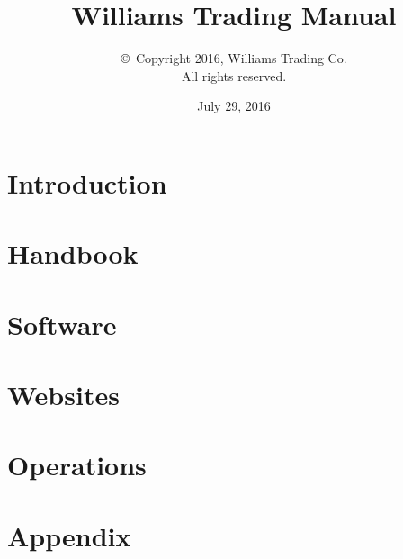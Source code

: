 \documentclass{book}
\title{Williams Trading Manual}
\author{\copyright~Copyright 2016, Williams Trading Co.\\
 All rights reserved.}
\date{July 29, 2016}
\begin{document}
	
\maketitle

\clearpage
{}
\tableofcontents

\setlength{\parindent}{0pt}
\setlength{\parskip}{1em}

\clearpage
{}
\chapter{Introduction}

\chapter{Handbook}

\chapter{Software}

\chapter{Websites}

\chapter{Operations}



\chapter{Appendix}


\pagebreak

\printindex
\end{document}
